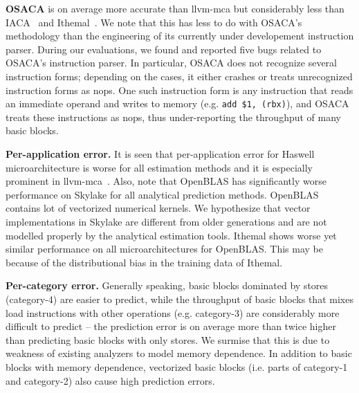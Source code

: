 \textbf{OSACA}\cite{osaca} is on average more accurate than llvm-mca but
considerably less than IACA~\cite{iaca} and Ithemal~\cite{ithemal}.
We note that this has less to do with OSACA's methodology than the engineering of its currently under developement instruction parser.
During our evaluations, we found and reported five bugs related to OSACA's instruction parser.
In particular, OSACA does not recognize several instruction forms;
depending on the cases, it either crashes or treats unrecognized instruction forms as nops.
One such instruction form is any instruction that reads an immediate operand and writes to memory
(e.g. \verb|add $1, (rbx)|), and OSACA treats these instructions as nops, thus under-reporting the throughput of
many basic blocks.

\textbf{Per-application error.} It is seen that per-application error for Haswell microarchitecture is worse for all estimation methods and it is especially prominent in llvm-mca~\cite{llvm-mca}. Also, note that OpenBLAS has significantly worse performance on Skylake for all analytical prediction methods. OpenBLAS contains lot of vectorized numerical kernels. We hypothesize that vector implementations in Skylake are different from older generations and are not modelled properly by the analytical estimation tools. Ithemal shows worse yet  similar performance on all microarchitectures for OpenBLAS. This may be because of the distributional bias in the training data of Ithemal.

\textbf{Per-category error.} Generally speaking, basic blocks dominated by stores
(category-4) are easier to predict,
while the throughput of basic blocks that mixes load instructions
with other operations (e.g. category-3) are considerably
more difficult to predict -- the prediction error is on average more than
twice higher than predicting basic blocks with only stores. 
We surmise that this is due to weakness of existing analyzers to model 
memory dependence.
In addition to basic blocks with memory dependence,
vectorized basic blocks (i.e. parts of category-1 and category-2) also cause high prediction errors.
\fi



